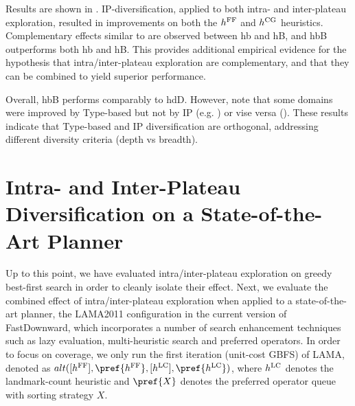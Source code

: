 Results are shown in . IP-diversification, applied to both
intra- and inter-plateau exploration, resulted in improvements on both the $\text{$h^\text{FF}$}$ and $\text{$h^\text{CG}$}$ heuristics.
Complementary effects similar to  are observed between hb and hB, and  hbB outperforms both hb and hB.
This provides additional empirical evidence for the hypothesis that intra/inter-plateau exploration  are complementary, and that they can be combined to yield superior performance.

Overall, hbB performs comparably to hdD. However, note that some domains were improved by Type-based but not by IP (e.g. )
or vise versa ().
% 
% 
These results indicate that Type-based and IP diversification are orthogonal,
addressing different diversity criteria (depth vs breadth).

\section{Intra- and Inter-Plateau Diversification on a State-of-the-Art Planner} %

Up to this point, we have evaluated intra/inter-plateau exploration on greedy best-first search in order to cleanly isolate their effect.
Next, we evaluate the combined effect of intra/inter-plateau exploration when applied to a state-of-the-art planner,
% 
the LAMA2011 configuration in the current version of FastDownward,
which incorporates a number of search enhancement techniques such as lazy evaluation, multi-heuristic search and preferred operators.
In order to focus on coverage, we only run the first iteration (unit-cost GBFS) of LAMA, 
denoted as $alt([\ff],\pref{\ff},[\lc],\pref{\lc})$, where
$\text{$h^\text{LC}$}$ denotes the landmark-count heuristic
and $\pref{X}$ denotes the preferred operator queue with sorting strategy $X$.


